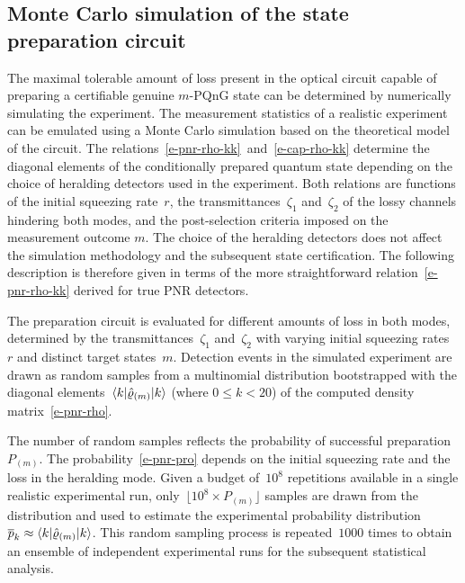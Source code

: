 \documentclass{article}
\begin{document}
\subsection*{Monte Carlo simulation of the state preparation circuit}

The maximal tolerable amount of loss present in the optical circuit capable of preparing a certifiable genuine $m$-PQnG state can be determined by numerically simulating the experiment. The measurement statistics of a realistic experiment can be emulated using a Monte Carlo simulation based on the theoretical model of the circuit. The relations~\eqref{e-pnr-rho-kk}~and~\eqref{e-cap-rho-kk} determine the diagonal elements of the conditionally prepared quantum state depending on the choice of heralding detectors used in the experiment. Both relations are functions of the initial squeezing rate~$r$, the transmittances~$\zeta_{1}$ and~$\zeta_{2}$ of the lossy channels hindering both modes, and the post-selection criteria imposed on the measurement outcome $m$. The choice of the heralding detectors does not affect the simulation methodology and the subsequent state certification. The following description is therefore given in terms of the more straightforward relation~\eqref{e-pnr-rho-kk} derived for true PNR detectors.

The preparation circuit is evaluated for different amounts of loss in both modes, determined by the transmittances~$\zeta_{1}$ and~$\zeta_{2}$ with varying initial squeezing rates~$r$ and distinct target states~${m}$. Detection events in the simulated experiment are drawn as random samples from a multinomial distribution bootstrapped with the diagonal elements~$\braket{k|\hat{\varrho}_{(m)}|k}$ (where ${0 \leq k < 20}$) of the computed density matrix~\eqref{e-pnr-rho}. 

The number of random samples reflects the probability of successful preparation $P_{(m)}$. The probability~\eqref{e-pnr-pro} depends on the initial squeezing rate and the loss in the heralding mode. Given a budget of~$10^{8}$ repetitions available in a single realistic experimental run, only~${\lfloor 10^{8} \times P_{(m)} \rfloor}$ samples are drawn from the distribution and used to estimate the experimental probability distribution~${\overline{p}_{k} \approx \braket{k|\hat{\varrho}_{(m)}|k}}$. This random sampling process is repeated~$1000$ times to obtain an ensemble of independent experimental runs for the subsequent statistical analysis.
\end{document}
